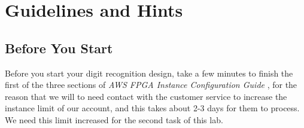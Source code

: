 \documentclass[paper=letter, fontsize=10pt]{scrartcl} %
\numberwithin{equation}{section} %
\numberwithin{figure}{section} %
\numberwithin{table}{section} %
\def\awstutorial{\textit{AWS FPGA Instance Configuration Guide }}
\begin{document}

\section{Guidelines and Hints}

\subsection{Before You Start}
Before you start your digit recognition design, take a few minutes to finish the first of the three sections of \awstutorial, for the reason that we will to need contact with the customer service to increase the instance limit of our account, and this takes about 2-3 days for them to process. We need this limit increased for the second task of this lab.
\end{document}
